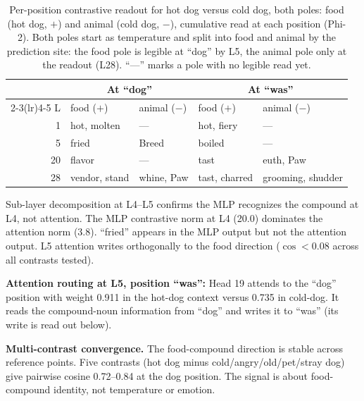 \documentclass[11pt]{article}
\begin{document}
\begin{table}[htbp]
\centering
\small
\begin{tabular}{@{}r ll ll@{}}
\toprule
 & \multicolumn{2}{c}{At ``dog''} & \multicolumn{2}{c}{At ``was''} \\
\cmidrule(lr){2-3}\cmidrule(lr){4-5}
L & food ($+$) & animal ($-$) & food ($+$) & animal ($-$) \\
\midrule
1  & hot, molten   & ---        & hot, fiery    & --- \\
5  & fried         & Breed      & boiled        & --- \\
20 & flavor        & ---        & tast          & euth, Paw \\
28 & vendor, stand & whine, Paw & tast, charred & grooming, shudder \\
\bottomrule
\end{tabular}
\caption{Per-position contrastive readout for hot dog versus cold dog, both
poles: food (hot dog, $+$) and animal (cold dog, $-$), cumulative read at each
position (Phi-2). Both poles start as temperature and split into food and animal
by the prediction site: the food pole is legible at ``dog'' by L5, the animal
pole only at the readout (L28). ``---'' marks a pole with no legible read yet.}
\label{tab:hotdog-trace}
\end{table}

Sub-layer decomposition at L4--L5 confirms the MLP recognizes the compound at
L4, not attention. The MLP contrastive norm at L4 (20.0) dominates the attention
norm (3.8). ``fried'' appears in the MLP output but not the attention output. L5
attention writes orthogonally to the food direction ($\cos < 0.08$ across all
contrasts tested).

\textbf{Attention routing at L5, position ``was'':}
Head 19 attends to the ``dog'' position with weight 0.911 in the hot-dog context
versus 0.735 in cold-dog. It reads the compound-noun information from ``dog'' and
writes it to ``was'' (its write is read out below).

\textbf{Multi-contrast convergence.} The food-compound direction is stable
across reference points. Five contrasts (hot dog minus cold/angry/old/pet/stray
dog) give pairwise cosine 0.72--0.84 at the dog position. The signal is about
food-compound identity, not temperature or emotion.
\end{document}
